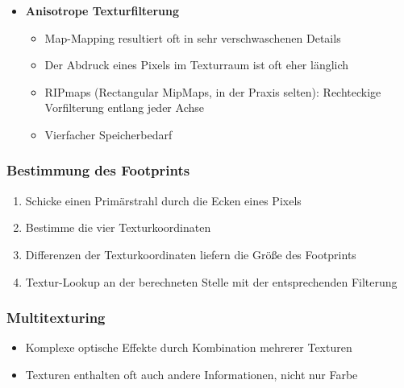 \begin{itemize}
\begin{itemize}
	\end{itemize}
	\item \textbf{Anisotrope Texturfilterung}
	\begin{itemize}
		\item Map-Mapping resultiert oft in sehr verschwaschenen Details
		\item Der Abdruck eines Pixels im Texturraum ist oft eher länglich
		\item RIPmaps (Rectangular MipMaps, in der Praxis selten): Rechteckige Vorfilterung entlang jeder Achse
		\item Vierfacher Speicherbedarf
	\end{itemize}
\end{itemize}

\subsubsection{Bestimmung des Footprints}
\begin{enumerate}
	\item Schicke einen Primärstrahl durch die Ecken eines Pixels
	\item Bestimme die vier Texturkoordinaten
	\item Differenzen der Texturkoordinaten liefern die Größe des Footprints
	\item Textur-Lookup an der berechneten Stelle mit der entsprechenden Filterung
\end{enumerate}

\subsubsection{Multitexturing}
\begin{itemize}
	\item Komplexe optische Effekte durch Kombination mehrerer Texturen
	\item Texturen enthalten oft auch andere Informationen, nicht nur Farbe
\end{itemize}


